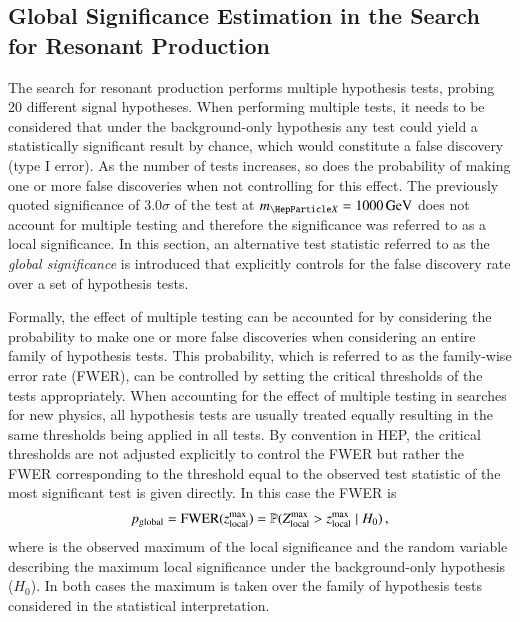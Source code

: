 
\subsection{Global Significance Estimation in the Search for Resonant \HH
  Production}%
\label{sec:global_significance}

The search for resonant \HH production performs multiple hypothesis tests,
probing 20 different signal hypotheses. When performing multiple tests, it needs
to be considered that under the background-only hypothesis any test could yield
a statistically significant result by chance, which would constitute a false
discovery (type I error). As the number of tests increases, so does the
probability of making one or more false discoveries when not controlling for
this effect. The previously quoted significance of $3.0\sigma$ of the test at
$\mX = \SI{1000}{\GeV}$ does not account for multiple testing and therefore the
significance was referred to as a local significance. In this section, an
alternative test statistic referred to as the \emph{global significance} is
introduced that explicitly controls for the false discovery rate over a set of
hypothesis tests.

\vspace{5em}

Formally, the effect of multiple testing can be accounted for by considering the
probability to make one or more false discoveries when considering an entire
family of hypothesis tests.
This probability, which is referred to as the family-wise error rate (FWER), can
be controlled by setting the critical thresholds of the tests
appropriately. When accounting for the effect of multiple testing in searches
for new physics, all hypothesis tests are usually treated equally resulting in
the same thresholds being applied in all tests. By convention in HEP, the
critical thresholds are not adjusted explicitly to control the FWER but rather
the FWER corresponding to the threshold equal to the observed test statistic of
the most significant test is given directly. In this case the FWER is
\begin{align*}
  p_{\text{global}} = \text{FWER}(z_{\text{local}}^{\text{max}})
  = \mathbb{P}( Z_{\text{local}}^{\text{max}} > z_{\text{local}}^{\text{max}} \mid H_0 )\,\text{,}
\end{align*}
where \zmaxlocal is the observed maximum of the local significance and
\Zmaxlocal the random variable describing the maximum local significance under
the background-only hypothesis ($H_0$). In both cases the maximum is taken over
the family of hypothesis tests considered in the statistical interpretation.


